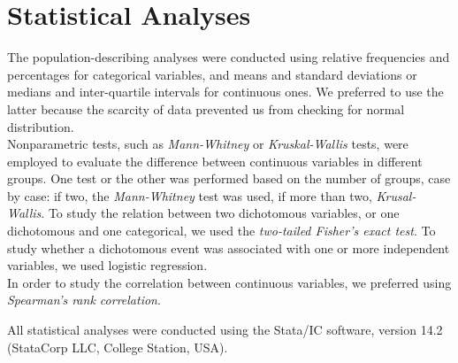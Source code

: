 \section{Statistical Analyses}\label{sec:statisticalanalyses}
The population-describing analyses were conducted using relative frequencies and percentages for categorical variables, and means and standard deviations or medians and inter-quartile intervals for continuous ones. We preferred to use the latter because the scarcity of data prevented us from checking for normal distribution.\\
Nonparametric tests, such as \textit{Mann-Whitney} or \textit{Kruskal-Wallis} tests, were employed to evaluate the difference between continuous variables in different groups. One test or the other was performed based on the number of groups, case by case: if two, the \textit{Mann-Whitney} test was used, if more than two, \textit{Krusal-Wallis}. To study the relation between two dichotomous variables, or one dichotomous and one categorical, we used the \textit{two-tailed Fisher's exact test}. To study whether a dichotomous event was associated with one or more independent variables, we used logistic regression.\\
In order to study the correlation between continuous variables, we preferred using \textit{Spearman's rank correlation}.

All statistical analyses were conducted using the Stata/IC software, version 14.2 (StataCorp LLC, College Station, USA).